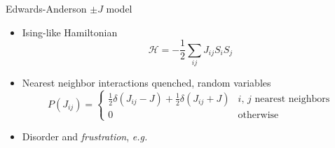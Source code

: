 \documentclass{beamer}
\newcommand{\ham}{\mathcal{H}}
\newcommand{\spinup}[1][6pt]{\tikz{\draw[spin] (0,-#1) -- (0, #1);}}
\begin{document}
\begin{frame}{Edwards-Anderson $\pm J$ model}
  \begin{itemize}
    \item Ising-like Hamiltonian
      \begin{equation*}
        \ham = -\frac{1}{2} \sum_{ij} J_{ij} S_i S_j
      \end{equation*}
    \item Nearest neighbor interactions \alert{quenched, random} variables
      \begin{equation*}
        P(J_{ij}) =
        \begin{cases}
          \frac{1}{2} \delta(J_{ij}-J) +
          \frac{1}{2} \delta(J_{ij}+J) &
          \text{$i$, $j$ nearest neighbors} \\
          0 & \text{otherwise}
        \end{cases}
      \end{equation*}
    \item Disorder and \emph{frustration}, \textit{e.g.}\quad
  \end{itemize}
\end{frame}
\end{document}
